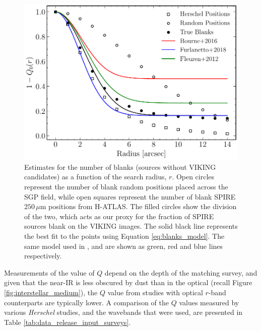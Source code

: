 \begin{figure}
    \centering
	\includegraphics[width=0.66\columnwidth]{Figures/Figure_2_4.pdf}
	\caption[An estimate for the number of blank sources as a function of search radius]{Estimates for the number of blanks (sources without VIKING candidates) as a function of the search radius, $r$. Open circles represent the number of blank random positions placed across the SGP field, while open squares represent the number of blank SPIRE $250\,\mu$m positions from H-ATLAS. The filled circles show the division of the two, which acts as our proxy for the fraction of SPIRE sources blank on the VIKING images. The solid black line represents the best fit to the points using Equation \ref{eq:blanks_model}. The same model used in \citealt{Fleuren_2012}, \citealt{Bourne_2016} and \citealt{Furlanetto_2018} are shown as green, red and blue lines respectively.}
	\label{fig:Q_estimate}
\end{figure}

Measurements of the value of $Q$ depend on the depth of the matching survey, and given that the near-IR is less obscured by dust than in the optical (recall Figure \ref{fig:interstellar_medium}), the $Q$ value from studies with optical $r$-band counterparts are typically lower. A comparison of the $Q$ values measured by various \textit{Herschel} studies, and the wavebands that were used, are presented in Table \ref{tab:data_release_input_surveys}.

